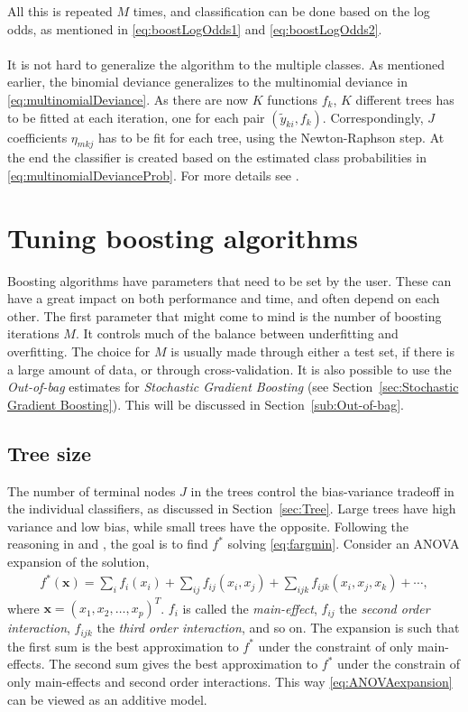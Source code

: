 All this is repeated $M$ times, and classification can be done based on the log odds, as mentioned in \eqref{eq:boostLogOdds1} and \eqref{eq:boostLogOdds2}. \\
\\
It is not hard to generalize the algorithm to the multiple classes. As mentioned earlier, the binomial deviance generalizes to the multinomial deviance in \eqref{eq:multinomialDeviance}. As there are now $K$ functions $f_k$, $K$ different trees has to be fitted at each iteration, one for each pair $(\tilde y_{k i}, f_k)$. Correspondingly, $J$ coefficients $\eta_{m k j}$ has to be fit for each tree, using the Newton-Raphson step. At the end the classifier is created based on the estimated class probabilities in \eqref{eq:multinomialDevianceProb}. For more details see \cite{friedman}.

\section{Tuning boosting algorithms}
\label{sec:Tuning boosting algorithms}
Boosting algorithms have parameters that need to be set by the user. These can have a great impact on both performance and time, and often depend on each other. The first parameter that might come to mind is the number of boosting iterations $M$. It controls much of the balance between underfitting and overfitting. The choice for $M$ is usually made through either a test set, if there is a large amount of data, or through cross-validation. It is also possible to use the \textit{Out-of-bag} estimates for  \textit{Stochastic Gradient Boosting} (see Section~\ref{sec:Stochastic Gradient Boosting}). This will be discussed in Section~\ref{sub:Out-of-bag}.

\subsection{Tree size}
\label{sub:Tree size}
The number of terminal nodes $J$ in the trees control the bias-variance tradeoff in the individual classifiers, as discussed in Section~\ref{sec:Tree}.  Large trees have high variance and low bias, while small trees have the opposite.   Following the reasoning in \cite{modstat} and \cite{friedman}, the goal is to find $f^*$ solving \eqref{eq:fargmin}. Consider an ANOVA expansion of the solution,
\begin{align}
  \label{eq:ANOVAexpansion} 
  f^*(\mathbf{x}) = \sum_{i} f_i(x_i) + \sum_{ij} f_{ij}(x_i, x_j) + 
  \sum_{ijk} f_{ijk}(x_i, x_j, x_k) + \cdots,
\end{align}
where $\mathbf{x} = (x_1, x_2, \ldots, x_p)^T$. $f_i$ is called the \textit{main-effect}, $f_{ij}$ the \textit{second order interaction}, $f_{ijk}$ the \textit{third order interaction}, and so on. The expansion is such that the first sum is the best approximation to $f^*$ under the constraint of only main-effects. The second sum gives the best approximation to $f^*$ under the constrain of only main-effects and second order interactions. This way \eqref{eq:ANOVAexpansion} can be viewed as an additive model. 

